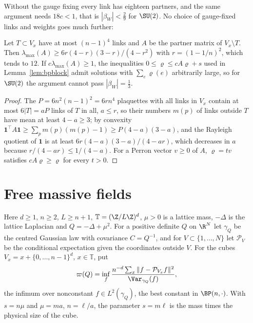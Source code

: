 Without the gauge fixing every link has eighteen partners, and the same
argument needs $18c<1$, that is $|\beta_W|<\frac29$ for $\SU(2)$. No choice of
gauge-fixed links and weights goes much further:

\begin{proposition}\label{prop:methodlimit}
Let $T\subset V_x$ have at most $(n-1)^4$ links and $A$ be the partner matrix
of $V_x\setminus T$. Then $\lambda_{\max}(A)\ge6r(4-r)(3-r)/(4-r^2)$ with
$r=(1-1/n)^2$, which tends to $12$. If $c\lambda_{\max}(A)\ge1$, the
inequalities $0\le\varrho\le cA\varrho+s$ used in Lemma~\ref{lem:bpblock}
admit solutions with $\sum_e\varrho(e)$ arbitrarily large, so for $\SU(2)$ the
argument cannot pass $|\beta_W|=\frac13$.
\end{proposition}

\begin{proof}
The $P=6n^2(n-1)^2=6rn^4$ plaquettes with all links in $V_x$ contain at most
$6|T|=aP$ links of $T$ in all, $a\le r$, so their numbers $m(p)$ of links outside
$T$ have mean at least $4-a\ge3$; by convexity $\mathbf1^{\top}A\mathbf1\ge
\sum_pm(p)(m(p)-1)\ge P(4-a)(3-a)$, and the Rayleigh quotient of $\mathbf1$ is
at least $6r(4-a)(3-a)/(4-ar)$, which decreases in $a$ because
$r/(4-ar)\le1/(4-a)$. For a Perron vector $v\ge0$ of $A$, $\varrho=tv$
satisfies $cA\varrho\ge\varrho$ for every $t>0$.
\end{proof}

\section{Free massive fields}\label{sec:free}

Here $d\ge1$, $n\ge2$, $L\ge n+1$, $\mathbb T=(\Z/L\Z)^d$, $\mu>0$ is a lattice
mass, $-\Delta$ is the lattice Laplacian and $Q=-\Delta+\mu^2$. For a positive
definite $Q$ on $\R^N$ let $\gamma_Q$ be the centred Gaussian law with
covariance $C=Q^{-1}$, and for $V\subset\{1,\dots,N\}$ let $\mathcal P_V$ be the
conditional expectation given the coordinates outside $V$. For the cubes
$V_x=x+\{0,\dots,n-1\}^d$, $x\in\mathbb T$, put
\begin{equation}\label{eq:ffvarpi}
\varpi(Q)=\inf_f\frac{n^{-d}\sum_x\|f-\mathcal P_{V_x}f\|^2}{\Var_{\gamma_Q}(f)},
\end{equation}
the infimum over nonconstant $f\in L^2(\gamma_Q)$, the best constant in
$\BP(n,\cdot)$. With $s=n\mu$ and $\mu=ma$, $n=\ell/a$, the parameter $s=m\ell$
is the mass times the physical size of the cube.

